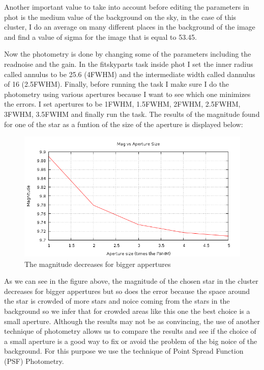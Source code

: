 Another important value to take into account before editing the parameters in phot is the medium value of the background on the sky, in the case of this cluster, I do an average on many different places in the background of the image and find a value of sigma for the image that is equal to 53.45.

Now the photometry is done by changing some of the parameters including the readnoise and the gain. In the fitskyparts task inside phot I set the inner radius called annulus to be 25.6 (4FWHM) and the intermediate width called dannulus of 16 (2.5FWHM). Finally, before running the task I make sure I do the photometry using various apertures because I want to see which one minimizes the errors. I set apertures to be 1FWHM, 1.5FWHM, 2FWHM, 2.5FWHM, 3FWHM, 3.5FWHM and finally run the task. The results of the magnitude found for one of the star as a funtion of the size of the aperture is displayed below:

\begin{figure}[h]
\centering
\includegraphics[width=12cm]{images/mag_vs_ap_size.png}
\caption{The magnitude decreases for bigger appertures}
\end{figure}

As we can see in the figure above, the magnitude of the chosen star in the cluster decreases for bigger appertures but so does the error because the space around the star is crowded of more stars and noice coming from the stars in the background so we infer that for crowded areas like this one the best choice is a small aperture. Although the results may not be as convincing, the use of another technique of photometry allows us to compare the results and see if the choice of a small aperture is a good way to fix or avoid the problem of the big noice of the background. For this purpose we use the technique of Point Spread Function (PSF) Photometry.

